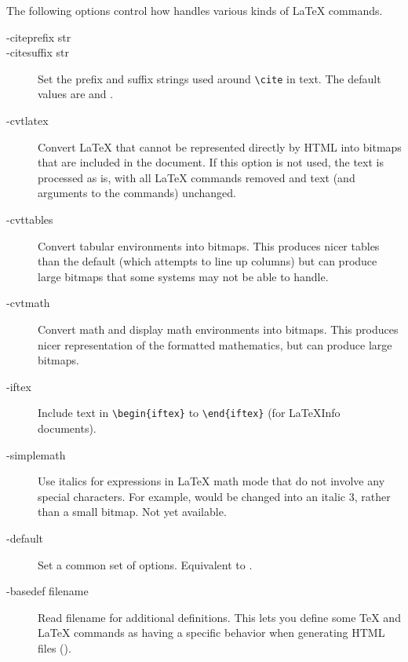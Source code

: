 The following options control how  handles various kinds of LaTeX
commands.
\begin{description}
\item[-citeprefix str]
\item[-citesuffix str]
Set the prefix and suffix strings used around
\verb+\cite+ in text.  The default values are \code{[} and \code{]}.

\item[-cvtlatex]Convert LaTeX that cannot be represented directly by HTML
into bitmaps that 
are included in the document.  If this option is not used, the text is
processed 
as is, with all LaTeX commands removed and text (and arguments to the
commands) unchanged.

\item[-cvttables]Convert tabular environments into bitmaps.  This produces
nicer tables than the default (which attempts to line up columns) but can
produce large bitmaps that some systems may not be able to handle.

\item[-cvtmath]Convert math and display math environments into bitmaps.  This
produces nicer representation of the formatted mathematics, but can produce
large bitmaps.

\item[-iftex]Include text in \verb+\begin{iftex}+ to
\verb+\end{iftex}+ (for LaTeXInfo documents).

\item[-simplemath]Use italics for
expressions in LaTeX math mode that do not involve any special characters.
For example,  would be changed into an italic 3, rather than a small
bitmap.  Not yet available.

\item[-default]Set a common set of options.  Equivalent to .

\item[-basedef filename]Read filename for additional definitions.  This lets
you define some TeX and LaTeX commands as having a specific behavior when
generating HTML files ().

\end{description}


